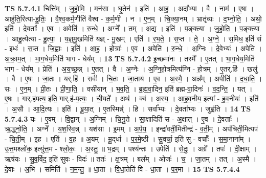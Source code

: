 \documentclass[17pt]{extarticle}
\begin{document}
                                \textbf{ TS 5.7.4.1} \newline
                  चित्ति᳚म् । जु॒हो॒मि॒ । मन॑सा । घृ॒तेन॑ । इति॑ । आ॒ह॒ । अदा᳚भ्या । वै । नाम॑ । ए॒षा । आहु॑ति॒रित्या-हु॒तिः॒ । वै॒श्व॒कर्म॒णीति॑ वैश्व - क॒र्म॒णी । न । ए॒न॒म् । चि॒क्या॒नम् । भ्रातृ॑व्यः । द॒भ्नो॒ति॒ । अथो॒ इति॑ । दे॒वताः᳚ । ए॒व । अवेति॑ । रु॒न्धे॒ । अग्ने᳚ । तम् । अ॒द्य । इति॑ । प॒ङ्क्त्या । जु॒हो॒ति॒ । प॒ङ्क्त्या । आहु॒त्येत्या - हु॒त्या॒ । य॒ज्ञ्॒मु॒खमिति॑ यज्ञ् - मु॒खम् । एति॑ । र॒भ॒ते॒ । स॒प्त । ते॒ । अ॒ग्ने॒ । स॒मिध॒ इति॑ सं - इधः॑ । स॒प्त । जि॒ह्वाः । इति॑ । आ॒ह॒ । होत्राः᳚ । ए॒व । अवेति॑ । रु॒न्धे॒ । अ॒ग्निः । दे॒वेभ्यः॑ । अपेति॑ । अ॒क्रा॒म॒त् । भा॒ग॒धेय॒मिति॑ भाग - धेय᳚म् । \textbf{  13} \newline
                  \newline
                                \textbf{ TS 5.7.4.2} \newline
                  इ॒च्छमा॑नः । तस्मै᳚ । ए॒तत् । भा॒ग॒धेय॒मिति॑ भाग - धेय᳚म् । प्रेति॑ । अ॒य॒च्छ॒न्न् । ए॒तत् । वै । अ॒ग्नेः । अ॒ग्नि॒हो॒त्रमित्य॑ग्नि - हो॒त्रम् । ए॒तर्.हि॑ । खलु॑ । वै । ए॒षः । जा॒तः । यर्.हि॑ । सर्वः॑ । चि॒तः । जा॒ताय॑ । ए॒व । अ॒स्मै॒ । अन्न᳚म् । अपीति॑ । द॒धा॒ति॒ । सः । ए॒न॒म् । प्री॒तः । प्री॒णा॒ति॒ । वसी॑यान् । भ॒व॒ति॒ । ब्र॒ह्म॒वा॒दिन॒ इति॑ ब्रह्म-वा॒दिनः॑ । व॒द॒न्ति॒ । यत् । ए॒षः । गार्.ह॑पत्य॒ इति॒ गार्.ह॑-प॒त्यः॒ । ची॒यते᳚ । अथ॑ । क्व॑ । अ॒स्य॒ । आ॒ह॒व॒नीय॒ इत्या᳚ -   ह॒व॒नीयः॑ । इति॑ । अ॒सौ । आ॒दि॒त्यः । इति॑ । ब्रू॒या॒त् । ए॒तस्मिन्न्॑ । हि । सर्वा᳚भ्यः । दे॒वता᳚भ्यः । जुह्व॑ति । \textbf{  14} \newline
                  \newline
                                \textbf{ TS 5.7.4.3} \newline
                  यः । ए॒वम् । वि॒द्वान् । अ॒ग्निम् । चि॒नु॒ते । सा॒क्षादिति॑ स - अ॒क्षात् । ए॒व । दे॒वताः᳚ । ऋ॒द्ध्नो॒ति॒ । अग्ने᳚ । य॒श॒स्वि॒न्न् । यश॑सा । इ॒मम् । अ॒र्प॒य॒ । इन्द्रा॑वती॒मितीन्द्र॑ - व॒ती॒म् । अप॑चिती॒मित्यप॑ - चि॒ती॒म् । इ॒ह । एति॑ । व॒ह॒ ॥ अ॒यम् । मू॒द्‌र्धा । प॒र॒मे॒ष्ठी । सु॒वर्चा॒ इति॑ सु - वर्चाः᳚ । स॒मा॒नाना᳚म् । उ॒त्त॒मश्लो॑क॒ इत्यु॑त्त॒म - श्लो॒कः॒ । अ॒स्तु॒ ॥ भ॒द्रम् । पश्य॑न्तः । उपेति॑ । से॒दुः॒ । अग्रे᳚ । तपः॑ । दी॒क्षाम् । ऋष॑यः । सु॒व॒र्विद॒ इति॑ सुवः - विदः॑ ॥ ततः॑ । क्ष॒त्रम् । बल᳚म् । ओजः॑ । च॒ । जा॒तम् । तत् । अ॒स्मै । दे॒वाः । अ॒भि । समिति॑ । न॒म॒न्तु॒ ॥ धा॒ता । वि॒धा॒तेति॑ वि - धा॒ता । प॒र॒मा । \textbf{  15} \newline
                  \newline
                                \textbf{ TS 5.7.4.4} \newline
\end{document}
